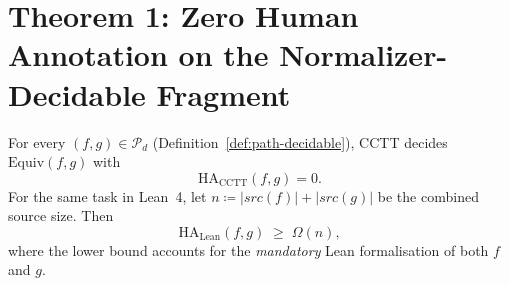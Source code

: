 \section{Theorem 1: Zero Human Annotation on the Normalizer-Decidable
         Fragment}
\label{sec:thm-annotation}

\begin{theorem}
\label{thm:zero-annotation}
For every $(f, g) \in \mathcal{P}_d$ (Definition~\ref{def:path-decidable}),
CCTT decides $\mathrm{Equiv}(f,g)$ with
\[
  \mathrm{HA}_{\mathrm{CCTT}}(f, g) = 0.
\]
For the same task in Lean~4, let $n \coloneqq |\mathit{src}(f)| +
|\mathit{src}(g)|$ be the combined source size.  Then
\[
  \mathrm{HA}_{\mathrm{Lean}}(f, g)
  \;\geq\; \Omega(n),
\]
where the lower bound accounts for the \emph{mandatory} Lean
formalisation of both $f$ and $g$.
\end{theorem}

